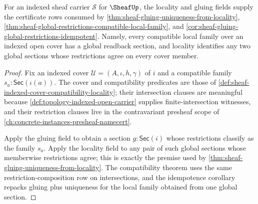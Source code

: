 \begin{theorem}
\label{thm:sheaf-locality-gluing-namecert-obligation}
For an indexed sheaf carrier $\mathcal{S}$ for $\SheafUp$, the locality and gluing fields supply the certificate rows consumed by \autoref{thm:sheaf-gluing-uniqueness-from-locality}, \autoref{thm:sheaf-global-restrictions-compatible-local-family}, and \autoref{cor:sheaf-gluing-global-restrictions-idempotent}. Namely, every compatible local family over an indexed open cover has a global readback section, and locality identifies any two global sections whose restrictions agree on every cover member.
\end{theorem}
\begin{proof}
Fix an indexed cover $\mathcal{U}=(A,\iota,h,\gamma)$ of $i$ and a compatible family $s_a:\mathsf{Sec}(\iota(a))$. The cover and compatibility predicates are those of \autoref{def:sheaf-indexed-cover-compatibility-locality}; their intersection clauses are meaningful because \autoref{def:topology-indexed-open-carrier} supplies finite-intersection witnesses, and their restriction clauses live in the contravariant presheaf scope of \autoref{ch:concrete-instances-presheaf-namecert}.

Apply the gluing field to obtain a section $g:\mathsf{Sec}(i)$ whose restrictions classify as the family $s_a$. Apply the locality field to any pair of such global sections whose memberwise restrictions agree; this is exactly the premise used by \autoref{thm:sheaf-gluing-uniqueness-from-locality}. The compatibility theorem uses the same restriction-composition row on intersections, and the idempotence corollary repacks gluing plus uniqueness for the local family obtained from one global section.
\end{proof}

